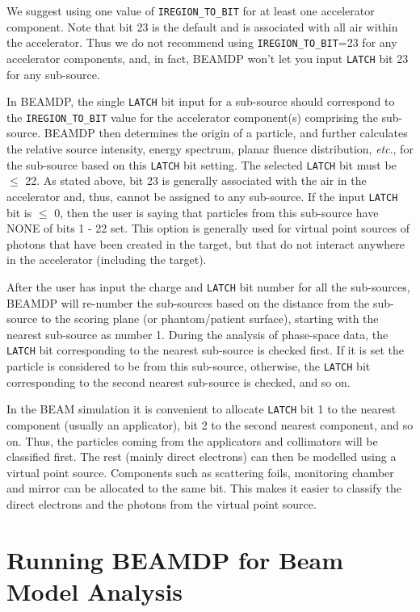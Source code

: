 \documentclass[12pt,twoside]{article}
\newcommand{\etc}{{\em etc}}
\begin{document}
We suggest using one value of
{\tt IREGION\_TO\_BIT} for at
least one accelerator component.  Note that bit 23 is the default and
is associated with all air within the accelerator.  Thus we do not
recommend using {\tt IREGION\_TO\_BIT}=23 for any accelerator components, and,
in fact, BEAMDP won't let you input {\tt LATCH} bit 23 for any sub-source.

In BEAMDP, the single
{\tt LATCH} bit input for a sub-source should correspond to the
{\tt IREGION\_TO\_BIT} value for the accelerator component(s) comprising
the sub-source.  BEAMDP then determines the origin of a particle, and further
calculates the relative source
intensity, energy spectrum, planar fluence distribution, \etc., for the
sub-source based on this {\tt LATCH} bit setting.  The selected {\tt LATCH}
bit must be $\leq$ 22.  As stated
above, bit 23 is generally associated with the air in the accelerator and,
thus, cannot be assigned to any sub-source.  If the input
{\tt LATCH} bit is $\leq$ 0, then the user is saying that particles
from this sub-source have NONE of bits 1 - 22 set.  This option is
generally used for virtual point sources of photons that have been created
in the target, but that do not interact anywhere in the accelerator
(including the target).

After the user has input the charge and {\tt LATCH} bit number for all the
sub-sources, BEAMDP will re-number the sub-sources based on the distance from
the sub-source to the scoring plane (or phantom/patient surface), starting with
 the nearest sub-source as number 1. During the analysis of phase-space data,
the {\tt LATCH} bit corresponding to the nearest sub-source is checked first.
If it is set the particle is considered to be from this sub-source, otherwise,
the {\tt LATCH} bit corresponding to the second nearest sub-source is checked,
and so on.

In the BEAM simulation it is convenient to allocate {\tt LATCH} bit 1 to the
nearest component
(usually an applicator), bit 2 to the second nearest component, and so on.
Thus, the particles coming from the applicators and collimators
will be classified first. The rest (mainly direct electrons) can then be
modelled using a virtual point source. Components such as scattering foils,
monitoring chamber and mirror can be allocated to the same bit.
This makes it easier to classify the direct electrons and the photons
from the virtual point source.

\section{Running BEAMDP for Beam Model Analysis}
\end{document}
